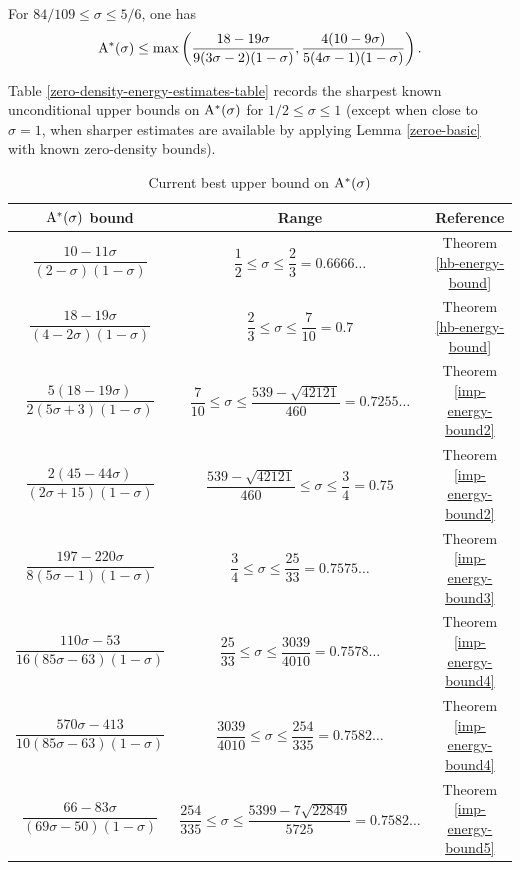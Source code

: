\begin{theorem}\label{imp-energy-bound8}
For $84/109 \le \sigma \le 5/6$, one has
\[
\mathrm{A}^*(\sigma) \le \max\left(\frac{18 - 19\sigma}{9(3\sigma - 2)(1 - \sigma)}, \frac{4(10 - 9\sigma)}{5(4\sigma - 1)(1 - \sigma)}\right).
\]
\end{theorem}
\derived
{}



Table \ref{zero-density-energy-estimates-table} records the sharpest known unconditional upper bounds on $\mathrm{A}^*(\sigma)$ for $1/2 \le \sigma \le 1$ (except when close to $\sigma = 1$, when sharper estimates are available by applying Lemma \ref{zeroe-basic} with known zero-density bounds).
\begin{table}[ht]
    \def\arraystretch{2}
    \centering
    \caption{Current best upper bound on $\mathrm{A}^*(\sigma)$}
    \begin{tabular}{|c|c|c|}
    \hline
    $\mathrm{A}^*(\sigma)$ bound & Range & Reference\\
    \hline
    $\dfrac{10 - 11\sigma}{(2 - \sigma)(1 - \sigma)}$ & $\dfrac{1}{2} \leq \sigma \le \dfrac{2}{3} = 0.6666\ldots$ & Theorem \ref{hb-energy-bound}\\
    \hline
    $\dfrac{18 - 19\sigma}{(4 - 2\sigma)(1 - \sigma)}$ & $\dfrac{2}{3} \leq \sigma \le \dfrac{7}{10} = 0.7$ & Theorem \ref{hb-energy-bound}\\
    \hline
    $\dfrac{5(18 - 19\sigma)}{2(5\sigma + 3)(1 - \sigma)}$ & $\dfrac{7}{10} \leq \sigma \le \dfrac{539 - \sqrt{42121}}{460} = 0.7255\ldots$ & Theorem \ref{imp-energy-bound2}\\
    \hline
    $\dfrac{2(45 - 44\sigma)}{(2\sigma + 15)(1 - \sigma)}$ & $\dfrac{539 - \sqrt{42121}}{460} \leq \sigma \le \dfrac{3}{4} = 0.75$ & Theorem \ref{imp-energy-bound2}\\
    \hline
    $\dfrac{197 - 220\sigma}{8(5\sigma - 1)(1 - \sigma)}$ & $\dfrac{3}{4} \leq \sigma \le \dfrac{25}{33} = 0.7575\ldots$ & Theorem \ref{imp-energy-bound3}\\
    \hline
    $\dfrac{110\sigma - 53}{16(85\sigma - 63)(1 - \sigma)}$ & $\dfrac{25}{33} \leq \sigma \le \dfrac{3039}{4010} = 0.7578\ldots$ & Theorem \ref{imp-energy-bound4}\\
    \hline
    $\dfrac{570\sigma - 413}{10(85\sigma - 63)(1 - \sigma)}$ & $\dfrac{3039}{4010} \leq \sigma \le \dfrac{254}{335} = 0.7582\ldots$ & Theorem \ref{imp-energy-bound4}\\
    \hline
    $\dfrac{66 - 83\sigma}{(69\sigma - 50)(1 - \sigma)}$ & $\dfrac{254}{335} \leq \sigma \le \dfrac{5399 - 7\sqrt{22849}}{5725} = 0.7582\ldots$ & Theorem \ref{imp-energy-bound5}\\

\end{tabular}
\end{table}
